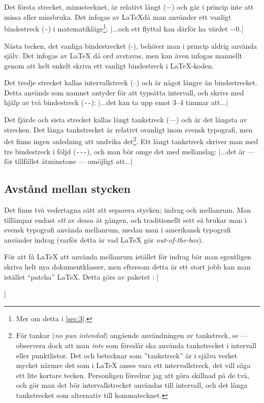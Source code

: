 \documentclass[10pt,../../a4.tex]{subfiles}
\begin{document}
Det första strecket, minustecknet, är relativt långt (\(-\)) och går i
princip inte att missa eller missbruka. Det infogas av \LaTeX då man
använder ett vanligt bindestreck (\verb|-|) i matematikläge\footnote{
Mer om detta i \cref{sec:3}.}:
\latex|...och ett flyttal kan därför ha värdet \(-0\).|

Nästa tecken, det vanliga bindestrecket (-), behöver man i princip aldrig
använda själv. Det infogas av \LaTeX{} då ord avstavas, men kan även
infogas manuellt genom att helt enkelt skriva ett vanligt bindestreck
i \LaTeX{}-koden.

Det tredje strecket kallas intervallstreck (–) och är något längre än
bindestrecket. Detta används som namnet antyder för att typsätta
intervall, och skrivs med hjälp av två bindestreck (\verb|--|):
\latex|...det kan ta upp emot 3--4 timmar att...|

Det fjärde och sista strecket kallas långt tankstreck (—) och är det längsta av
strecken. Det långa tankstrecket är relativt ovanligt inom svensk typografi, men det
finns ingen anledning att undvika det\footnote{För tankar (\emph{no pun
intended}) angående användningen av tankstreck, se 
\textcite[\ppno~46–47]{LIU98} — observera dock att man \emph{inte} som 
\citeauthor*{LIU98} föreslår ska använda tankstrecket i intervall eller
punktlistor. Det \textcite{Sprakradet08} och \citeauthor*{LIU98} betecknar som
”tankstreck” är i själva verket mycket närmre det som i \LaTeX{} anses vara ett
intervallstreck, det vill säga ett lite kortare tecken. Personligen föredrar jag 
att göra skillnad på de två, och gör man det bör intervallstrecket användas till
intervall, och det långa tankstrecket som alternativ till kommatecknet.}.
Ett långt tankstreck skriver man med tre bindestreck i följd
(\verb|---|), och man bör omge det med mellanslag:
\latex|...det är --- för tillfället åtminstone --- omöjligt att...|

\subsection{Avstånd mellan stycken}
Det finns två vedertagna sätt att separera stycken; indrag och
mellanrum. Man tillämpar endast \emph{ett} av dessa åt gången, och
traditionellt sett så brukar man i svensk typografi använda mellanrum,
medan man i amerikansk typografi använder indrag (varför detta är vad
\LaTeX{} gör \emph{out-of-the-box}).

För att få \LaTeX{} att använda mellanrum istället för indrag bör man
egentligen skriva helt nya dokumentklasser, men eftersom detta är ett
stort jobb kan man istället \foreignquote{english}{patcha} \LaTeX{}. Detta görs av
paketet :
\latex|\usepackage{parskip}|
\end{document}
